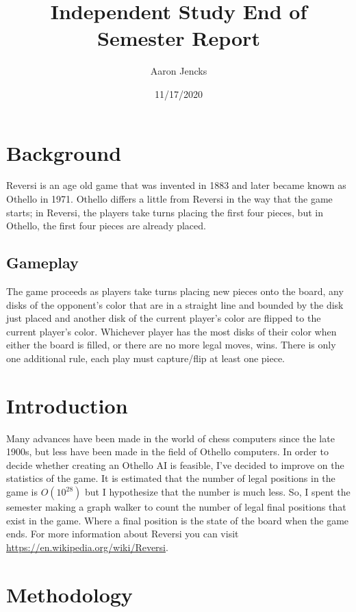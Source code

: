\documentclass{article}
\title{Independent Study End of Semester Report}
\author{Aaron Jencks}
\date{11/17/2020}
\begin{document}
\maketitle
\tableofcontents
\newpage

\section{Background}

Reversi is an age old game that was invented in 1883 and later became known as Othello in 1971. Othello differs a little from Reversi in the way that the game starts; in Reversi, the players take turns placing the first four pieces, but in Othello, the first four pieces are already placed.

\subsection{Gameplay}

The game proceeds as players take turns placing new pieces onto the board, any disks of the opponent's color that are in a straight line and bounded by the disk just placed and another disk of the current player's color are flipped to the current player's color. Whichever player has the most disks of their color when either the board is filled, or there are no more legal moves, wins. There is only one additional rule, each play must capture/flip at least one piece.

\section{Introduction}

Many advances have been made in the world of chess computers since the late 1900s, but less have been made in the field of Othello computers. In order to decide whether creating an Othello AI is feasible, I've decided to improve on the statistics of the game. It is estimated that the number of legal positions in the game is $O(10^{28})$ but I hypothesize that the number is much less. So, I spent the semester making a graph walker to count the number of legal final positions that exist in the game. Where a final position is the state of the board when the game ends. For more information about Reversi you can visit \url{https://en.wikipedia.org/wiki/Reversi}.

\section{Methodology}
\end{document}
